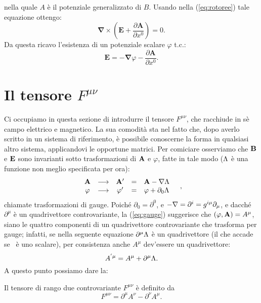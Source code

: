 nella quale $A$ \`e il potenziale 
generalizzato di $B$. Usando nella (\ref{eq:rotoree}) tale equazione
ottengo:
\begin{equation}
  \mathbf{\nabla} \times \left(\mathbf{E} + \frac{\partial
      \mathbf{A}}{\partial x^0}\right) = 0. \label{eq:rotoreepiua}
\end{equation}
Da questa ricavo l'esistenza di un potenziale scalare $\varphi$ t.c.:
\begin{equation}
  \mathbf{E} = - \mathbf{\nabla} \varphi - \frac{ \partial
    \mathbf{A}}{\partial x^0}. \label{eq:potenzialee}
\end{equation}

\section{Il tensore $F^{\mu\nu}$}
Ci occupiamo in questa sezione di introdurre il tensore $F^{\mu\nu}$,
che racchiude in s\`e campo elettrico e magnetico. La sua comodit\`a
sta nel fatto che, dopo averlo scritto in un sistema di riferimento,
\`e possibile conoscerne la forma in qualsiasi altro sistema,
applicandovi le opportune matrici. Per comiciare osserviamo che
$\mathbf{B}$ e $\mathbf{E}$ sono invarianti sotto trasformazioni di
$\mathbf{A}$ e $\varphi$, fatte in tale modo ($\Lambda$ \`e una funzione non
meglio specificata per ora):
\begin{equation}
  \begin{array}{cccccl}
    \mathbf{A} & \longrightarrow & \mathbf{A'} & = & \mathbf{A} - \mathbf{\nabla} \Lambda &\\
    \varphi & \longrightarrow & \varphi' & = & \varphi +
    \partial_0 \Lambda &
  \end{array},
  \label{eq:gauge}
\end{equation}
chiamate trasformazioni di gauge.
\newline Poich\'e $\partial_0 = \partial^0 $, e $ - \mathbf{ \nabla } =
\partial^i = g^{i\mu}\partial_{\mu}$, e dacch\'e $\partial^{\mu}$ \`e
un quadrivettore controvariante, la (\ref{eq:gauge}) suggerisce che $
( \varphi , \mathbf{A} ) = A^{\mu} $, siano le quattro componenti di un
quadrivettore controvariante che trasforma per gauge; infatti, se
nella seguente equazione $\partial^{\mu}\Lambda$ \`e un quadrivettore (il
che accade se \la \ \`e uno scalare), per consistenza anche $A^{\mu}$
dev'essere un quadrivettore:
$$
A^{'\mu} = A^{\mu} + \partial^{\mu}\Lambda.
$$
A questo punto possiamo dare la:
\begin{definizione}[Quadritensore $F^{\mu\nu}$]
  Il tensore di rango due controvariante $F^{\mu\nu}$ \`e definito da
$$
F^{\mu\nu} = \partial^{\mu}A^{\nu} - \partial^{\nu}A^{\mu}.
$$
\end{definizione}
